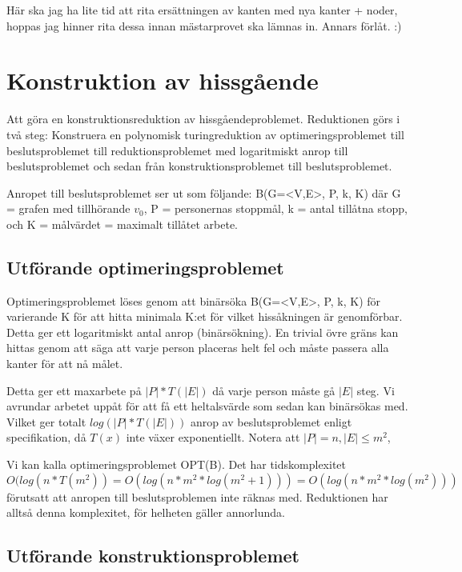\documentclass[a4paper,10pt,twoside]{article}
\begin{document}
Här ska jag ha lite tid att rita ersättningen av kanten med nya kanter + noder, hoppas jag hinner rita dessa innan mästarprovet ska lämnas in. Annars förlåt. :)

\newpage

\section{Konstruktion av hissgående}

Att göra en konstruktionsreduktion av hissgåendeproblemet. Reduktionen görs i två steg: Konstruera en polynomisk turingreduktion av optimeringsproblemet till beslutsproblemet till reduktionsproblemet med logaritmiskt anrop till beslutsproblemet och sedan från konstruktionsproblemet till beslutsproblemet.

Anropet till beslutsproblemet ser ut som följande: B(G=<V,E>, P, k, K) där G = grafen med tillhörande $v_0$, P = personernas stoppmål, k = antal tillåtna stopp, och K = målvärdet = maximalt tillåtet arbete.

\subsection{Utförande optimeringsproblemet}

Optimeringsproblemet löses genom att binärsöka B(G=<V,E>, P, k, K) för varierande K för att hitta minimala K:et för vilket hissåkningen är genomförbar. Detta ger ett logaritmiskt antal anrop (binärsökning). En trivial övre gräns kan hittas genom att säga att varje person placeras helt fel och måste passera alla kanter för att nå målet.

Detta ger ett maxarbete på $|P|*T(|E|)$ då varje person måste gå $|E|$ steg. Vi avrundar arbetet uppåt för att få ett heltalsvärde som sedan kan binärsökas med. Vilket ger totalt $log(|P|*T(|E|))$ anrop av beslutsproblemet enligt specifikation, då $T(x)$ inte växer exponentiellt. Notera att $|P| = n, |E| \le m^2$,

Vi kan kalla optimeringsproblemet OPT(B). Det har tidskomplexitet $O(log(n*T(m^2)) = O(log(n*m^2*log(m^2+1))) = O(log(n*m^2*log(m^2)))$ förutsatt att anropen till beslutsproblemen inte räknas med. Reduktionen har alltså denna komplexitet, för helheten gäller annorlunda.

\subsection{Utförande konstruktionsproblemet}
\end{document}
